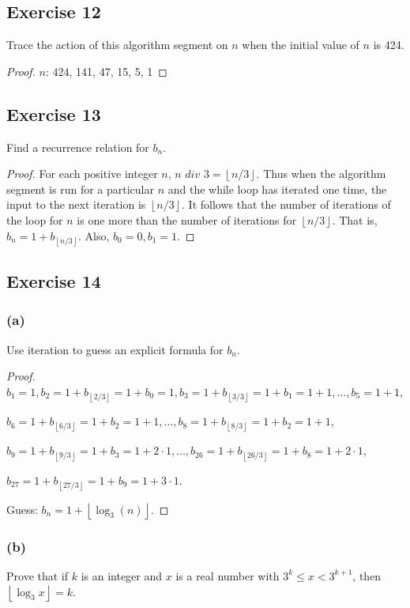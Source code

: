 \documentclass[14pt]{extarticle}
\newcommand{\floor}[1]{{\left\lfloor#1\right\rfloor}}
\begin{document}
\subsection{Exercise 12}
Trace the action of this algorithm segment on \(n\) when the initial value of \(n\) is 424.

\begin{proof}
\(n\): 424, 141, 47, 15, 5, 1
\end{proof}

\subsection{Exercise 13}
Find a recurrence relation for \(b_n\).

\begin{proof}
For each positive integer \(n\), \(n \,\,div\,\, 3 = \floor{n/3}\). Thus when the algorithm segment is run for a particular 
\(n\) and the while loop has iterated one time, the input to the next iteration is \(\floor{n/3}\). It follows that the 
number of iterations of the loop for \(n\) is one more than the number of iterations for \(\floor{n/3}\). That is, 
\(b_n = 1 + b_{\floor{n/3}}\). Also, \(b_0 = 0, b_1 = 1\).
\end{proof}

\subsection{Exercise 14}
\subsubsection{(a)}
Use iteration to guess an explicit formula for \(b_n\).

\begin{proof}
\(b_1 = 1, b_2 = 1 + b_{\floor{2/3}} = 1 + b_0 = 1, b_3 = 1 + b_{\floor{3/3}} = 1 + b_1 = 1 + 1, \ldots, b_5 = 1+1\),

\(b_6 = 1 + b_{\floor{6/3}} = 1 + b_2 = 1 + 1, \ldots, b_8 = 1 + b_{\floor{8/3}} = 1 + b_2 = 1 + 1\),

\(b_9 = 1 + b_{\floor{9/3}} = 1 + b_3 = 1 + 2 \cdot 1, \ldots, b_{26} = 1 + b_{\floor{26/3}} = 1 + b_8 = 1 + 2 \cdot 1\),

\(b_{27} = 1 + b_{\floor{27/3}} = 1 + b_9 = 1 + 3 \cdot 1\).

Guess: \(b_n = 1 + \floor{\log_3(n)}\).
\end{proof}

\subsubsection{(b)}
Prove that if \(k\) is an integer and \(x\) is a real number with \(3^k \leq x < 3^{k+1}\), then \(\floor{\log_3 x} = k\).
\end{document}
